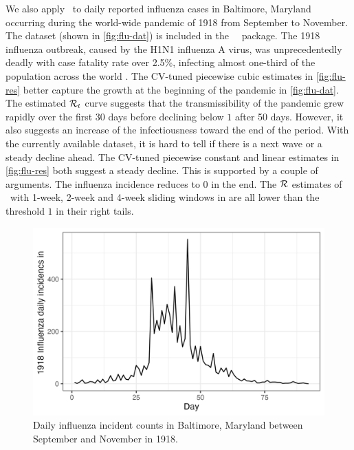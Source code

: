 We also apply \RtEstim\ to daily reported influenza cases in Baltimore, Maryland
occurring during the world-wide pandemic of 1918 from September to November. 
The dataset (shown in \autoref{fig:flu-dat}) is included in the \EpiEstim\ \R\ package. 
The 1918 influenza outbreak, caused by the H1N1 influenza A virus, was unprecedentedly
deadly with case fatality rate over 2.5\%, infecting almost one-third of the population across the world
\citep{taubenberger20061918}. The CV-tuned piecewise cubic estimates in \autoref{fig:flu-res}
better capture the growth at the beginning of the pandemic in \autoref{fig:flu-dat}. 
The estimated $\mathcal{R}_t$ curve suggests that the transmissibility of the pandemic 
grew rapidly over the first 30 days before declining below $1$ after 50 days. 
However, it also suggests an increase of the infectiousness toward the end of the period. 
With the currently available dataset, it is hard to tell if there is a next wave 
or a steady decline ahead. The CV-tuned piecewise 
constant and linear estimates in \autoref{fig:flu-res} both suggest a steady decline. 
This is supported by a couple of arguments. The influenza incidence reduces to $0$ in the end. 
The $\mathcal{R}$ estimates of \EpiEstim\ with 1-week, 2-week and 4-week sliding windows 
in \cite{cori2013new} are all lower than the threshold $1$ in their right tails. 



\begin{figure}[!tb]
    \centering
    \includegraphics[width=0.9\linewidth]{fig/flu_dat.png}
    \caption{Daily influenza incident counts in Baltimore, Maryland between September 
    and November in 1918.} 
    \label{fig:flu-dat}
\end{figure} 

